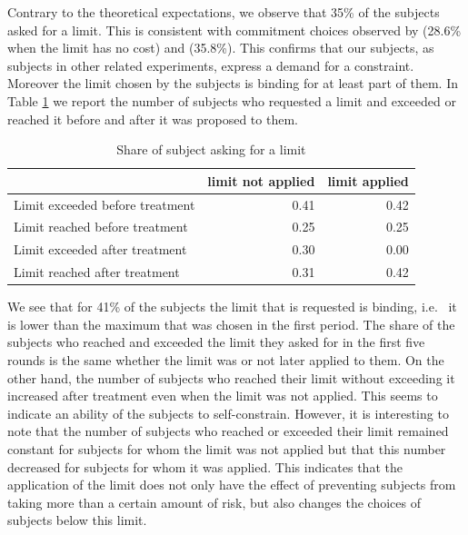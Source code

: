 \documentclass[
]{book}
\begin{document}
Contrary to the theoretical expectations, we observe that 35\% of the subjects
asked for a limit.
This is consistent with commitment choices observed by \citet{houser2018temptation} (28.6\%
when the limit has no cost) and \citet{toussaert2018eliciting} (35.8\%).
This confirms that our subjects, as subjects in other related experiments, express a demand for a constraint.
Moreover the limit chosen by the subjects is binding for at least part of them.
In Table \ref{tab:limit-ask2} we report the number of subjects who requested a limit and
exceeded or reached it before and after it was proposed to them.

\begin{table}

\caption{\label{tab:limit-ask2}Share of subject asking for a limit}
\centering
\begin{tabular}[t]{l|r|r}
\hline
  & limit not applied & limit applied\\
\hline
Limit exceeded before treatment & 0.41 & 0.42\\
\hline
Limit reached before treatment & 0.25 & 0.25\\
\hline
Limit exceeded after treatment & 0.30 & 0.00\\
\hline
Limit reached after treatment & 0.31 & 0.42\\
\hline
\end{tabular}
\end{table}

We see that for 41\% of the subjects the limit that is requested is binding, i.e.~
it is lower than the maximum that was chosen in the first period.
The share of the subjects who reached and exceeded the limit they asked for in
the first five rounds is the same
whether the limit was or not later applied to them.
On the other hand, the number of subjects who reached their limit without
exceeding it increased after treatment even when the limit was not applied.
This seems to indicate an ability of the subjects to self-constrain.
However, it is interesting to note that the number of subjects who reached or
exceeded their limit remained constant for subjects for whom the limit was not
applied but that this number decreased for subjects for whom it was applied.
This indicates that the application of the limit does not only have the effect
of preventing subjects from taking more than a certain amount of risk, but also
changes the choices of subjects below this limit.
\end{document}
